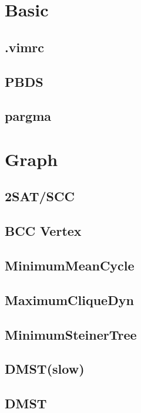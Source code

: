 \section{Basic}
	\subsection{.vimrc}
	
	\subsection{PBDS}
	
	\subsection{pargma}
	
\section{Graph}
	\subsection{2SAT/SCC}
	
	\subsection{BCC Vertex}
	
	\subsection{MinimumMeanCycle}
	
	\subsection{MaximumCliqueDyn}
	
	\subsection{MinimumSteinerTree}
	
	\subsection{DMST(slow)}
	
	\subsection{DMST}
	
